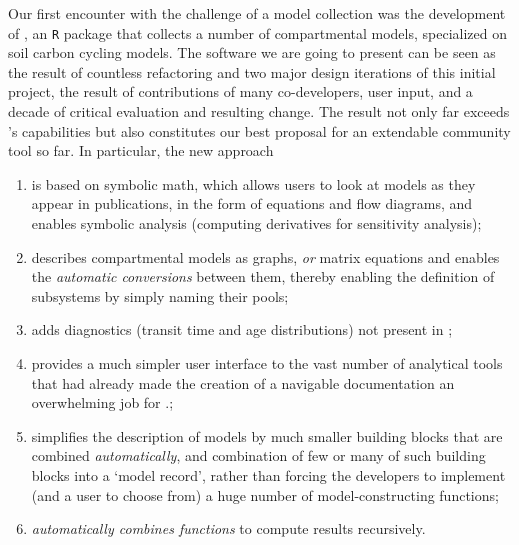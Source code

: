 Our first encounter with the challenge of a model collection was the
development of \SoilR{} \citep{Sierra2012GeosciModelDev}, an \texttt{R} package
that collects a number of compartmental models, specialized on soil carbon cycling models.  The
software we are going to present can be seen as the result of countless
refactoring and two major design iterations of this initial project, the result
of contributions of many co-developers, user input,  and a decade of critical
evaluation and resulting change.  The result not only far
exceeds \SoilR's capabilities but also constitutes our best proposal for an
extendable community tool so far.  In particular, the new approach
\begin{enumerate}
  \item
    is based on symbolic math, which allows users to look at models
    as they appear in publications, in the form of equations and flow diagrams,
    and enables symbolic analysis (\eg computing derivatives for sensitivity analysis);
  \item 
    describes compartmental models as graphs, \emph{or} matrix equations and enables the \emph{automatic conversions} between them, thereby enabling the definition of subsystems by simply naming their pools;
  \item
    adds diagnostics (transit time and age distributions) not present in \SoilR{};
  \item
    provides a much simpler user interface 
    to the vast number of analytical tools that had already made the creation of a navigable documentation an overwhelming job for \SoilR.;

  \item
    simplifies the description of models by much smaller building blocks that are combined
    \emph{automatically}, and combination of few or many of such building blocks into a `model record',
    rather than forcing the developers to implement (and a user to choose from) a
    huge number of model-constructing functions;
  \item 
    \emph{automatically combines functions} to compute results recursively.
\end{enumerate}

